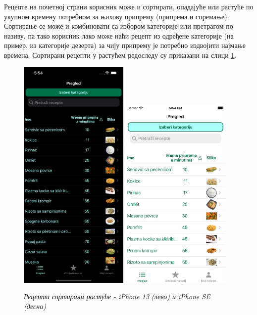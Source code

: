 \documentclass[12pt,oneside]{memoir}
\begin{document}
\indent Рецепте на почетној страни корисник може и сортирати, опадајуће или растуће по укупном времену потребном за њихову припрему (припрема и спремање). Сортирање се може и комбиновати са избором категорије или претрагом по називу, па тако корисник лако може наћи рецепт из одређене категорије (на пример, из категорије дезерта) за чију припрему је потребно издвојити најмање времена. Сортирани рецепти у растућем редоследу су приказани на слици \ref{slika:сортирање_растуће_1}.

\begin{figure} [H]
    \centering
    \captionsetup{justification=centering}
    \includegraphics[width=0.475\textwidth]{images/simulators/view images/dark - sort asc.png}
    \hfill
    \includegraphics[width=0.475\textwidth]{images/simulators/view images/light - sort asc.png} 
    \caption{\textit{Рецепти сортирани растуће - iPhone 13 (лево) и iPhone SE (десно)}}
    \label{slika:сортирање_растуће_1}
\end{figure}
\end{document}
